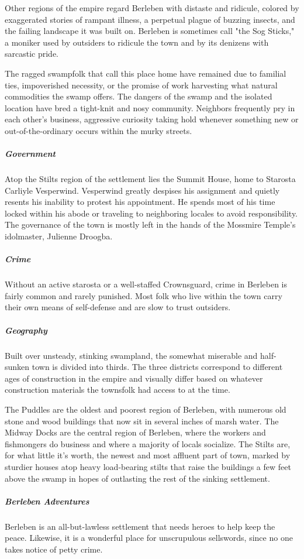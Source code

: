 \documentclass[10pt,a4paper,twoside,bg=print,twocolumn,openany,nodeprecatedcode]{dndbook}
\begin{document}
Other regions of the empire regard Berleben with distaste and ridicule, colored by exaggerated stories of rampant illness, a perpetual plague of buzzing insects, and the failing landscape it was built on. Berleben is sometimes call "the Sog Sticks," a moniker used by outsiders to ridicule the town and by its denizens with sarcastic pride.

The ragged swampfolk that call this place home have remained due to familial ties, impoverished necessity, or the promise of work harvesting what natural commodities the swamp offers. The dangers of the swamp and the isolated location have bred a tight-knit and nosy community. Neighbors frequently pry in each other's business, aggressive curiosity taking hold whenever something new or out-of-the-ordinary occurs within the murky streets.

\subparagraph{Government}
Atop the Stilts region of the settlement lies the Summit House, home to Starosta Carliyle Vesperwind. Vesperwind greatly despises his assignment and quietly resents his inability to protest his appointment. He spends most of his time locked within his abode or traveling to neighboring locales to avoid responsibility. The governance of the town is mostly left in the hands of the Mossmire Temple's idolmaster, Julienne Droogba.

\subparagraph{Crime}
Without an active starosta or a well-staffed Crownsguard, crime in Berleben is fairly common and rarely punished. Most folk who live within the town carry their own means of self-defense and are slow to trust outsiders.

\subparagraph{Geography}
Built over unsteady, stinking swampland, the somewhat miserable and half-sunken town is divided into thirds. The three districts correspond to different ages of construction in the empire and visually differ based on whatever construction materials the townsfolk had access to at the time.

The Puddles are the oldest and poorest region of Berleben, with numerous old stone and wood buildings that now sit in several inches of marsh water. The Midway Docks are the central region of Berleben, where the workers and fishmongers do business and where a majority of locals socialize. The Stilts are, for what little it's worth, the newest and most affluent part of town, marked by sturdier houses atop heavy load-bearing stilts that raise the buildings a few feet above the swamp in hopes of outlasting the rest of the sinking settlement.

\subparagraph{Berleben Adventures}
Berleben is an all-but-lawless settlement that needs heroes to help keep the peace. Likewise, it is a wonderful place for unscrupulous sellswords, since no one takes notice of petty crime.
\end{document}
